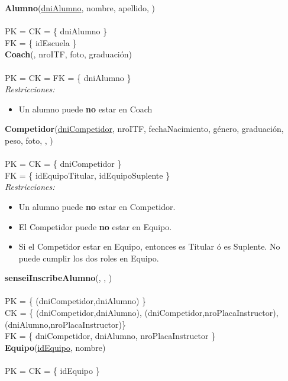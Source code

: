 \noindent\textbf{Alumno}(\uline{dniAlumno}, nombre, apellido, )
\\
\\
PK = CK = \{ dniAlumno \} \\
FK = \{ idEscuela \} \\

\noindent\textbf{Coach}(, nroITF, foto, graduación)
\\
\\
PK = CK = FK = \{ dniAlumno \} \\

\textit{Restricciones:}
\begin{itemize}
	\item Un alumno puede \textbf{no} estar en Coach
\end{itemize}

\noindent\textbf{Competidor}(\uline{dniCompetidor}, nroITF, fechaNacimiento, género, graduación, peso, foto, , )
\\
\\
PK = CK = \{ dniCompetidor \} \\
FK = \{ idEquipoTitular, idEquipoSuplente \} \\


\textit{Restricciones:}
\begin{itemize}
	\item Un alumno puede \textbf{no} estar en Competidor.
	\item El Competidor puede \textbf{no} estar en Equipo.
	\item Si el Competidor estar en Equipo, entonces es Titular ó es Suplente. No puede cumplir los dos roles en Equipo.
\end{itemize}


\noindent\textbf{senseiInscribeAlumno}(, , )
\\
\\
PK = \{ (dniCompetidor,dniAlumno) \} \\
CK = \{ (dniCompetidor,dniAlumno), (dniCompetidor,nroPlacaInstructor), (dniAlumno,nroPlacaInstructor)\} \\
FK = \{ dniCompetidor, dniAlumno, nroPlacaInstructor \} \\


\noindent\textbf{Equipo}(\uline{idEquipo}, nombre)
\\
\\
PK = CK = \{ idEquipo \} \\



